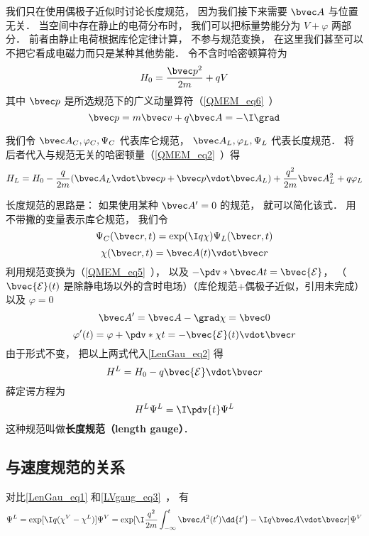 
\begin{issues}
\issueTODO
\end{issues}


我们只在使用偶极子近似时讨论长度规范， 因为我们接下来需要 $\bvec A$ 与位置无关． 当空间中存在静止的电荷分布时， 我们可以把标量势能分为 $V + \varphi$ 两部分． 前者由静止电荷根据库伦定律计算， 不参与规范变换， 在这里我们甚至可以不把它看成电磁力而只是某种其他势能． 令不含时哈密顿算符为
\begin{equation}
H_0 = \frac{\bvec p^2}{2m} + qV
\end{equation}
其中 $\bvec p$ 是所选规范下的广义动量算符（\autoref{QMEM_eq6}~）
\begin{equation}
\bvec p = m \bvec v + q\bvec A = -\I \grad
\end{equation}

我们令 $\bvec A_C, \varphi_C, \Psi_C$ 代表库仑规范， $\bvec A_L, \varphi_L, \Psi_L$ 代表长度规范． 将后者代入与规范无关的哈密顿量（\autoref{QMEM_eq2}~）得
\begin{equation}\label{LenGau_eq2}
H_L = H_0 - \frac{q}{2m} (\bvec A_L \vdot \bvec p + \bvec p \vdot \bvec A_L)
+ \frac{q^2}{2m} \bvec A_L^2 + q \varphi_L
\end{equation}


长度规范的思路是： 如果使用某种 $\bvec A' = 0$ 的规范， 就可以简化该式． 用不带撇的变量表示库仑规范， 我们令
\begin{equation}\label{LenGau_eq1}
\Psi_C(\bvec r, t) = \exp(\I q\chi)\Psi_L(\bvec r, t)
\end{equation}
\begin{equation}
\chi(\bvec r, t) = \bvec A(t) \vdot \bvec r
\end{equation}
利用规范变换为（\autoref{QMEM_eq5}~）， 以及 $-\pdv*{\bvec A}{t} = \bvec {\mathcal E}$， （$\bvec {\mathcal E}(t)$ 是除静电场以外的含时电场）（库伦规范+偶极子近似，引用未完成）以及 $\varphi = 0$
\begin{equation}
\bvec A' = \bvec A - \grad \chi = \bvec 0
\end{equation}
\begin{equation}
\varphi'(t) = \varphi + \pdv*{\chi}{t} = -\bvec {\mathcal E}(t) \vdot \bvec r
\end{equation}
由于形式不变， 把以上两式代入\autoref{LenGau_eq2} 得
\begin{equation}
H^L = H_0 - q\bvec{\mathcal{E}} \vdot \bvec r
\end{equation}
薛定谔方程为
\begin{equation}
H^L \Psi^L = \I \pdv{t} \Psi^L
\end{equation}
这种规范叫做\textbf{长度规范（length gauge）}．

\subsection{与速度规范的关系}
对比\autoref{LenGau_eq1} 和\autoref{LVgaug_eq3}~， 有
\begin{equation}\label{LenGau_eq3}
\Psi^L = \exp[\I q(\chi^V - \chi^L)]\Psi^V = \exp[\I\frac{q^2}{2m}\int_{-\infty}^t \bvec A^2(t')\dd{t'} - \I q \bvec A\vdot \bvec r] \Psi^V
\end{equation}

